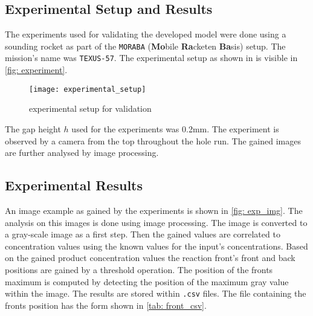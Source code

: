 \documentclass[../thesis.tex]{subfiles}
\begin{document}
\subsection{Experimental Setup and Results}

The experiments used for validating the developed model were done using a sounding rocket as part of the \texttt{MORABA} (\textbf{Mo}bile \textbf{Ra}cketen \textbf{Ba}sis) \cite{stamminger2012moraba} setup. The mission's name was \texttt{TEXUS-57}. The experimental setup as shown in \cite{stergiou2022effects} is visible in \autoref{fig: experiment}.
\begin{figure}[htbp]
	\centering
	\texttt{[image: experimental\_setup]}
	\caption{experimental setup for validation \cite{stergiou2022effects}}
	\label{fig: experiment}
\end{figure}
The gap height $h$ used for the experiments was 0.2mm. The experiment is observed by a camera from the top throughout the hole run. The gained images are further analysed by image processing.

\subsection{Experimental Results}

An image example as gained by the experiments is shown in \autoref{fig: exp_img}. The analysis on this images is done using image processing. The image is converted to a gray-scale image as a first step. Then the gained values are correlated to concentration values using the known values for the input's concentrations. Based on the gained product concentration values the reaction front's front and back positions are gained by a threshold operation. The position of the fronts maximum is computed by detecting the position of the maximum gray value within the image. The results are stored within \texttt{.csv} files. The file containing the fronts position has the form shown in \autoref{tab: front_csv}. 
\end{document}
